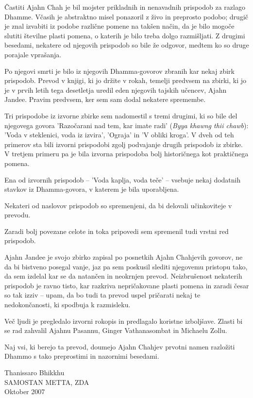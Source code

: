 
Častiti Ajahn Chah je bil mojster prikladnih in nenavadnih prispodob za razlago Dhamme. Včasih je abstraktno misel ponazoril z živo in preprosto podobo; drugič je znal izvabiti iz podobe različne pomene na takšen način, da je bilo mogoče slutiti številne plasti pomena, o katerih je bilo treba dolgo razmišljati. Z drugimi besedami, nekatere od njegovih prispodob so bile že odgovor, medtem ko so druge porajale vprašanja.

Po njegovi smrti je bilo iz njegovih Dhamma-govorov zbranih kar nekaj zbirk prispodob. Prevod v knjigi, ki jo držite v rokah, temelji predvsem na zbirki, ki jo je v prvih letih tega desetletja uredil eden njegovih tajskih učencev, Ajahn Jandee. Pravim predvsem, ker sem sam dodal nekatere spremembe.

Tri prispodobe iz izvorne zbirke sem nadomestil s tremi drugimi, ki so bile del njegovega govora 'Razočarani nad tem, kar imate radi' (\emph{Byya khawng thii chawb}): 'Voda v steklenici, voda iz izvira', 'Ograja' in 'V obliki kroga'.  V dveh od teh primerov sta bili izvorni prispodobi zgolj podvajanje drugih prispodob iz zbirke. V tretjem primeru pa je bila izvorna prispodoba bolj historičnega kot praktičnega pomena.

Ena od izvornih prispodob – 'Voda kaplja, voda teče' – vsebuje nekaj dodatnih stavkov iz Dhamma-govora, v katerem je bila uporabljena.

Nekateri od naslovov prispodob so spremenjeni, da bi delovali učinkoviteje v prevodu.

Zaradi bolj povezane celote in toka pripovedi sem spremenil tudi vrstni red prispodob.

Ajahn Jandee je svojo zbirko zapisal po posnetkih Ajahn Chahjevih govorov, ne da bi bistveno posegal vanje, jaz pa sem poskusil slediti njegovemu pristopu tako, da sem izdelal kar se da natančen in neokrnjen prevod. Neizbrušenost nekaterih prispodob je ravno tisto, kar razkriva nepričakovane plasti pomena in zaradi česar so tak izziv – upam, da bo tudi ta prevod uspel pričarati nekaj te nedokončanosti, ki spodbuja k razmisleku.

Več ljudi je pregledalo izvorni rokopis in predlagalo koristne izboljšave. Zlasti bi se rad zahvalil Ajahnu Pasannu, Ginger Vathanasombat in Michaelu Zollu.

Naj vsi, ki berejo ta prevod, doumejo Ajahn Chahjev prvotni namen razložiti Dhammo s tako preprostimi in nazornimi besedami.

\vfill

{\par\raggedleft
Thanissaro Bhikkhu\\
SAMOSTAN METTA, ZDA\\
Oktober 2007
\par}
